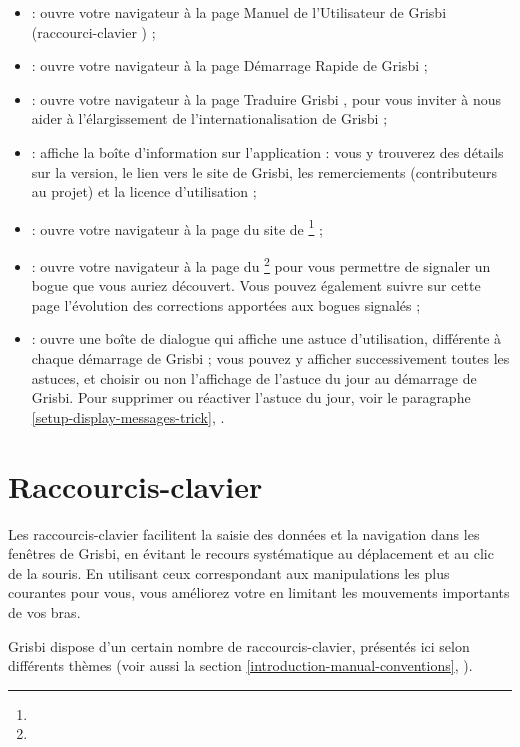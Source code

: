 \begin{itemize}
	\item {} : ouvre votre navigateur à la page \og Manuel de l'Utilisateur de Grisbi \fg{} (raccourci-clavier ) ;
	\item {} : ouvre votre navigateur à la page \og Démarrage Rapide de Grisbi \fg{} ;
	\item {} : ouvre votre navigateur à la page \og Traduire Grisbi \fg{}, pour vous inviter à nous aider à l'élargissement de 	l'internationalisation de Grisbi ;
	\item {} : affiche la boîte d'information sur l'application : vous y trouverez des détails sur la version, le lien vers le site de Grisbi, les remerciements (contributeurs au projet) et la licence d'utilisation ;
	\item {} : ouvre votre navigateur à la page du site de \footnote{\urlGrisbi{}} ;
	\item {} : ouvre votre navigateur à la page du \footnote{\urlBugTracker{}} pour vous permettre de signaler un bogue que vous auriez découvert. Vous pouvez également suivre sur cette page l'évolution des corrections apportées aux bogues signalés ;
	\item {} : ouvre une boîte de dialogue qui affiche une astuce d'utilisation, différente à chaque démarrage de Grisbi ; vous pouvez y 	afficher successivement toutes les astuces, et choisir ou non l'affichage de 	l'astuce du jour au démarrage de Grisbi. Pour supprimer ou réactiver l'astuce du 	jour, voir le paragraphe \vref{setup-display-messages-trick}, .
\end{itemize}


\section{Raccourcis-clavier\label{home-shortcuts}}


Les raccourcis-clavier facilitent la saisie des données et la navigation dans les fenêtres de Grisbi, en évitant le recours systématique au déplacement et au clic de la souris. En utilisant ceux correspondant aux manipulations les plus courantes pour vous, vous améliorez votre  en limitant les mouvements importants de vos bras.
 
Grisbi dispose d'un certain nombre de raccourcis-clavier, présentés ici selon différents thèmes (voir aussi la section \vref{introduction-manual-conventions}, ).


